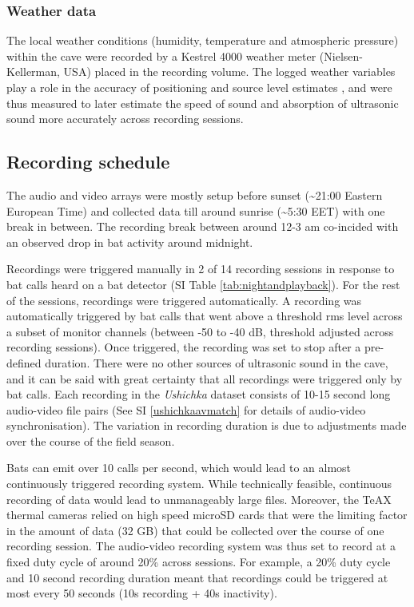 \documentclass[
]{book}
\begin{document}
\hypertarget{weather-data}{%
\subsubsection{Weather data}\label{weather-data}}

The local weather conditions (humidity, temperature and atmospheric pressure) within the cave were recorded by a Kestrel 4000 weather meter (Nielsen-Kellerman, USA) placed in the recording volume. The logged weather variables play a role in the accuracy of positioning and source level estimates \citep{h2018a, lawrence1982a}, and were thus measured to later estimate the speed of sound and absorption of ultrasonic sound more accurately across recording sessions.

\hypertarget{recschedule}{%
\subsection{Recording schedule}\label{recschedule}}

The audio and video arrays were mostly setup before sunset (\textasciitilde21:00 Eastern European Time) and collected data till around sunrise (\textasciitilde5:30 EET) with one break in between. The recording break between around 12-3 am co-incided with an observed drop in bat activity around midnight.

Recordings were triggered manually in 2 of 14 recording sessions in response to bat calls heard on a bat detector (SI Table \ref{tab:nightandplayback}). For the rest of the sessions, recordings were triggered automatically. A recording was automatically triggered by bat calls that went above a threshold rms level across a subset of monitor channels (between -50 to -40 dB, threshold adjusted across recording sessions). Once triggered, the recording was set to stop after a pre-defined duration. There were no other sources of ultrasonic sound in the cave, and it can be said with great certainty that all recordings were triggered only by bat calls. Each recording in the \emph{Ushichka} dataset consists of 10-15 second long audio-video file pairs (See SI \ref{ushichkaavmatch} for details of audio-video synchronisation). The variation in recording duration is due to adjustments made over the course of the field season.

Bats can emit over 10 calls per second, which would lead to an almost continuously triggered recording system. While technically feasible, continuous recording of data would lead to unmanageably large files. Moreover, the TeAX thermal cameras relied on high speed microSD cards that were the limiting factor in the amount of data (32 GB) that could be collected over the course of one recording session. The audio-video recording system was thus set to record at a fixed duty cycle of around 20\% across sessions. For example, a 20\% duty cycle and 10 second recording duration meant that recordings could be triggered at most every 50 seconds (10s recording + 40s inactivity).
\end{document}
